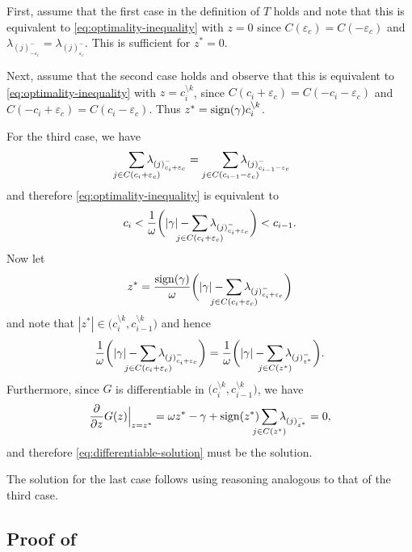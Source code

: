 First, assume that the first case in the definition of \(T\) holds
and note that this is equivalent to \eqref{eq:optimality-inequality} with \(z
= 0\) since \(C({\varepsilon_c}) = C(-{\varepsilon_c})\) and
\(\lambda_{(j)^-_{-{\varepsilon_c}}} = \lambda_{(j)^-_{{\varepsilon_c}}}\).
This is sufficient for \(z^* = 0\).

Next, assume that the second case holds and observe that this is equivalent
to \eqref{eq:optimality-inequality} with
\(z = c_i^{\setminus k}\), since
\(C(c_i + {\varepsilon_c}) = C(-c_i - {\varepsilon_c})\) and
\(C(-c_i + {\varepsilon_c}) = C(c_i - {\varepsilon_c})\). Thus \(z^* =
\operatorname{sign}(\gamma)c_i^{\setminus k}\).

For the third case, we have
\[
  \smashoperator{\sum_{j \in C(c_i + {\varepsilon_c})}} \lambda_{(j)^-_{c_i + {\varepsilon_c}}}
  =
  \smashoperator[r]{\sum_{j \in C(c_{i-1} - {\varepsilon_c})}} \lambda_{(j)^-_{c_{i-1} - {\varepsilon_c}}}
\]
and therefore \eqref{eq:optimality-inequality} is equivalent to
\[
  c_i < \frac{1}{\omega} \bigg( |\gamma| - \smashoperator{\sum_{j \in C(c_i + {\varepsilon_c})}} \lambda_{(j)^-_{c_i + {\varepsilon_c}}} \bigg) < c_{i -1}.
\]
Now let
\begin{equation}
  \label{eq:differentiable-solution}
  z^* = \frac{\sign(\gamma)}{\omega} \bigg( |\gamma| - \smashoperator{\sum_{j \in C(c_i + {\varepsilon_c})}} \lambda_{(j)^-_{c_i + {\varepsilon_c}}} \bigg)
\end{equation}
and note that \(|z^*| \in \big(c_i^{\setminus k}, c_{i-1}^{\setminus k}\big)\) and hence
\[
  \frac{1}{\omega} \bigg( |\gamma| - \smashoperator{\sum_{j \in C(c_i + {\varepsilon_c})}} \lambda_{(j)^-_{c_i + {\varepsilon_c}}} \bigg)
  =
  \frac{1}{\omega} \bigg( |\gamma| - \smashoperator{\sum_{j \in C(z^*)}} \lambda_{(j)^-_{z^*}} \bigg).
\]
Furthermore, since \(G\) is differentiable in \(\big(c_i^{\setminus k}, c_{i-1}^{\setminus k}\big)\), we have
\[
  \frac{\partial}{\partial z} G(z) \Big|_{z = z^*}
  = \omega z^* - \gamma + \sign(z^*) \smashoperator{\sum_{j \in C(z^*)}} \lambda_{(j)^-_{z^*}} = 0,
\]
and therefore \eqref{eq:differentiable-solution} must be the solution.

The solution for the last case follows using reasoning analogous to that of the
third case.

\subsection{Proof of }


